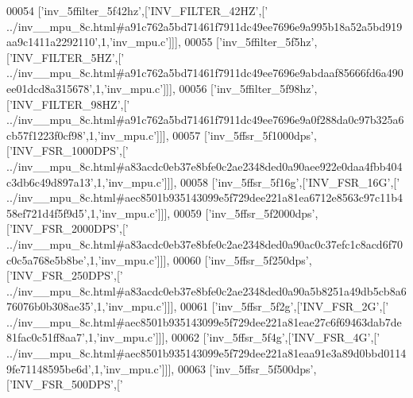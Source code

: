 \begin{DoxyCode}
00054   [\textcolor{stringliteral}{'inv\_5ffilter\_5f42hz'},[\textcolor{stringliteral}{'INV\_FILTER\_42HZ'},[\textcolor{stringliteral}{'
      ../inv\_\_mpu\_8c.html#a91c762a5bd71461f7911dc49ee7696e9a995b18a52a5bd919aa9c1411a2292110'},1,\textcolor{stringliteral}{'inv\_mpu.c'}]]],
00055   [\textcolor{stringliteral}{'inv\_5ffilter\_5f5hz'},[\textcolor{stringliteral}{'INV\_FILTER\_5HZ'},[\textcolor{stringliteral}{'
      ../inv\_\_mpu\_8c.html#a91c762a5bd71461f7911dc49ee7696e9abdaaf85666fd6a490ee01dcd8a315678'},1,\textcolor{stringliteral}{'inv\_mpu.c'}]]],
00056   [\textcolor{stringliteral}{'inv\_5ffilter\_5f98hz'},[\textcolor{stringliteral}{'INV\_FILTER\_98HZ'},[\textcolor{stringliteral}{'
      ../inv\_\_mpu\_8c.html#a91c762a5bd71461f7911dc49ee7696e9a0f288da0c97b325a6cb57f1223f0cf98'},1,\textcolor{stringliteral}{'inv\_mpu.c'}]]],
00057   [\textcolor{stringliteral}{'inv\_5ffsr\_5f1000dps'},[\textcolor{stringliteral}{'INV\_FSR\_1000DPS'},[\textcolor{stringliteral}{'
      ../inv\_\_mpu\_8c.html#a83acdc0eb37e8bfe0c2ae2348ded0a90aee922e0daa4fbb404c3db6c49d897a13'},1,\textcolor{stringliteral}{'inv\_mpu.c'}]]],
00058   [\textcolor{stringliteral}{'inv\_5ffsr\_5f16g'},[\textcolor{stringliteral}{'INV\_FSR\_16G'},[\textcolor{stringliteral}{'
      ../inv\_\_mpu\_8c.html#aec8501b935143099e5f729dee221a81ea6712e8563c97c11b458ef721d4f5f9d5'},1,\textcolor{stringliteral}{'inv\_mpu.c'}]]],
00059   [\textcolor{stringliteral}{'inv\_5ffsr\_5f2000dps'},[\textcolor{stringliteral}{'INV\_FSR\_2000DPS'},[\textcolor{stringliteral}{'
      ../inv\_\_mpu\_8c.html#a83acdc0eb37e8bfe0c2ae2348ded0a90ac0c37efc1c8acd6f70c0c5a768e5b8be'},1,\textcolor{stringliteral}{'inv\_mpu.c'}]]],
00060   [\textcolor{stringliteral}{'inv\_5ffsr\_5f250dps'},[\textcolor{stringliteral}{'INV\_FSR\_250DPS'},[\textcolor{stringliteral}{'
      ../inv\_\_mpu\_8c.html#a83acdc0eb37e8bfe0c2ae2348ded0a90a5b8251a49db5cb8a676076b0b308ae35'},1,\textcolor{stringliteral}{'inv\_mpu.c'}]]],
00061   [\textcolor{stringliteral}{'inv\_5ffsr\_5f2g'},[\textcolor{stringliteral}{'INV\_FSR\_2G'},[\textcolor{stringliteral}{'
      ../inv\_\_mpu\_8c.html#aec8501b935143099e5f729dee221a81eae27c6f69463dab7de81fac0c51ff8aa7'},1,\textcolor{stringliteral}{'inv\_mpu.c'}]]],
00062   [\textcolor{stringliteral}{'inv\_5ffsr\_5f4g'},[\textcolor{stringliteral}{'INV\_FSR\_4G'},[\textcolor{stringliteral}{'
      ../inv\_\_mpu\_8c.html#aec8501b935143099e5f729dee221a81eaa91e3a89d0bbd01149fe71148595be6d'},1,\textcolor{stringliteral}{'inv\_mpu.c'}]]],
00063   [\textcolor{stringliteral}{'inv\_5ffsr\_5f500dps'},[\textcolor{stringliteral}{'INV\_FSR\_500DPS'},[\textcolor{stringliteral}{'
}
\end{DoxyCode}
